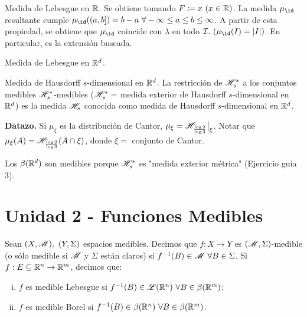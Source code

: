
\begin{eg}
	Medida de Lebesgue en $\mathbb{R}$. Se obtiene tomando $F \coloneq x \ (x \in \mathbb{R})$. La medida $\mu_{\id}$ resultante cumple $\mu_{\id}((a,b]) = b-a \ \forall -\infty \leq a \leq b \leq \infty$. A partir de esta propiedad, se obtiene que $\mu_{\id}$ coincide con $\lambda$ en todo $\mcal{I}.\ (\mu_{\id}(I) = |I|)$. En particular, es la extensión buscada.
\end{eg}

\begin{eg}[¿?]
	Medida de Lebesgue en $\mathbb{R}^d$.
\end{eg}

\begin{eg}
	Medida de Hausdorff $s$-dimensional en $\mathbb{R}^d$. La restricción de $\mathscr{H}_{s}^{*}$ a los conjuntos medibles $\mathscr{H}_{s}^{*}$-medibles ($\mathscr{H}_{s}^{*} =$ medida exterior de Hausdorff $s$-dimensional en $\mathbb{R}^d$) es la medida $\mathscr{H}_{s}$ conocida como medida de Hausdorff $s$-dimensional en $\mathbb{R}^d$.
\end{eg}

\noindent \textbf{Datazo.} Si $\mu_{\xi}$ es la distribución de Cantor, $\mu_{\xi} = \mathscr{H}_{\frac{\log 2}{\log 3}} \big|_{\xi}$. Notar que $\mu_{\xi}(A) = \mathscr{H}_{\frac{\log 2}{\log 3}} (A \cap \xi)$, donde $\xi =$ conjunto de Cantor.

\begin{remark}
	Los $\beta(\mathbb{R}^d)$ son medibles porque $\mathscr{H}_{s}^{*}$ es "medida exterior métrica" (Ejercicio guía 3).
\end{remark}

\section{Unidad 2 - Funciones Medibles}

\begin{definition}
	Sean $(X, \mathscr{M}),\ (Y, \Sigma)$ espacios medibles. Decimos que $f : X \to Y$ es $(\mathscr{M}, \Sigma)$-medible (o sólo medible si $\mathscr{M}$ y $\Sigma$ están claros) si $f^{-1}(B) \in \mscr{M} \ \forall B \in \Sigma$. Si $f : E \subseteq \mathbb{R}^n \to \mathbb{R}^m$, decimos que:
	\begin{enumerate}[i.]
		\item $f$ es medible Lebesgue si $f^{-1}(B) \in \mathscr{L}(\mathbb{R}^n) \ \forall B \in \beta(\mathbb{R}^m)$;

		\item $f$ es medible Borel si $f^{-1}(B) \in \beta(\mathbb{R}^n) \ \forall B \in \beta(\mathbb{R}^m)$.
	\end{enumerate}
\end{definition}

